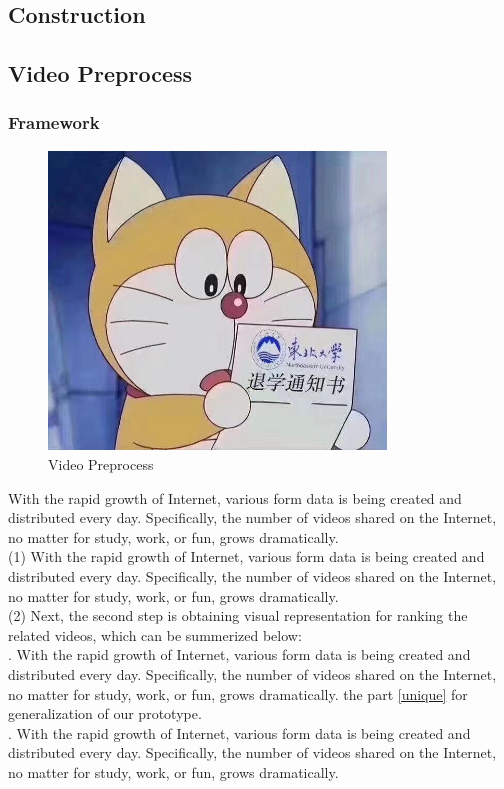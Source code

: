 \documentclass[a4paper,12pt,UTF8]{ctexart}
\newcommand{\rmnum}[1]{\romannumeral #1}
\begin{document}
\begin{spacing}{1.1}
\section{Construction} \label{construction}
\setcounter{table}{0}
\setcounter{figure}{0}
\subsection{Video Preprocess} \label{videopreprocess}
\subsubsection{Framework}
\begin{figure}[h]
	\centering
	\includegraphics[width=0.8\textwidth]{videopre.jpg}
	\caption{Video Preprocess}
	\label{videopre}
\end{figure}
With the rapid growth of Internet, various form data is being created and distributed every day. Specifically, the number of videos shared on the Internet, no matter for study, work, or fun, grows dramatically. 
\\\indent(1) With the rapid growth of Internet, various form data is being created and distributed every day. Specifically, the number of videos shared on the Internet, no matter for study, work, or fun, grows dramatically. 
\\\indent(2) Next, the second step is obtaining visual representation for ranking the related videos, which can be summerized below: 
\\\indent\rmnum{1}. With the rapid growth of Internet, various form data is being created and distributed every day. Specifically, the number of videos shared on the Internet, no matter for study, work, or fun, grows dramatically.  the part \ref{unique} for generalization of our prototype. 
\\\indent\rmnum{2}. With the rapid growth of Internet, various form data is being created and distributed every day. Specifically, the number of videos shared on the Internet, no matter for study, work, or fun, grows dramatically. 

\end{spacing}
\end{document}
